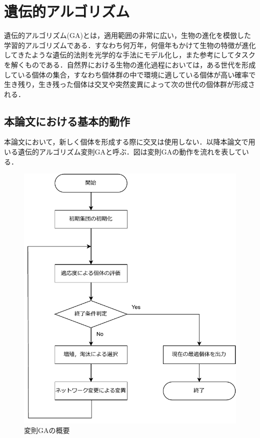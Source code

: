 \section{遺伝的アルゴリズム}
遺伝的アルゴリズム(GA)とは，適用範囲の非常に広い，生物の進化を模倣した学習的アルゴリズムである\cite{遺伝的アルゴリズム}．すなわち何万年，何億年もかけて生物の特徴が進化してきたような遺伝的法則を光学的な手法にモデル化し，また参考にしてタスクを解くものである．自然界における生物の進化過程においては，ある世代を形成している個体の集合，すなわち個体群の中で環境に適している個体が高い確率で生き残り，生き残った個体は交叉や突然変異によって次の世代の個体群が形成される．

\subsection{本論文における基本的動作}
本論文において，新しく個体を形成する際に交叉は使用しない．以降本論文で用いる遺伝的アルゴリズム変則GAと呼ぶ．図は変則GAの動作を流れを表している．

\begin{figure}[h]
    \begin{center}
        \includegraphics[scale=0.8]{img/expga.pdf}
        \caption{変則GAの概要}
    \end{center}
\end{figure}


